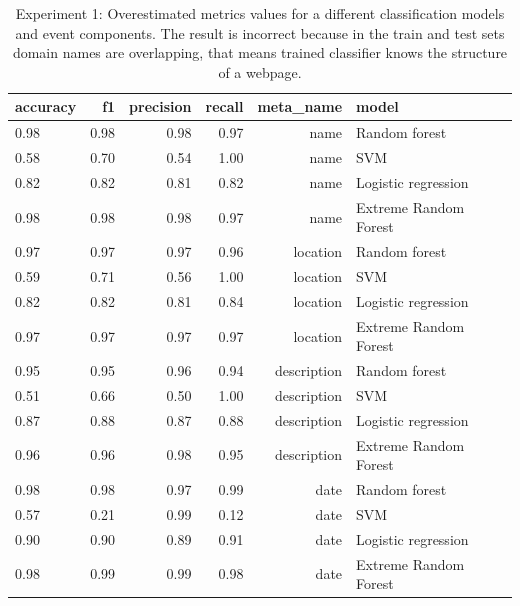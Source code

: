 \begin{table}[h]
\begin{center}
{\renewcommand{\arraystretch}{1.2}
\begin{tabular}{lrrrrll}
\toprule
accuracy &    f1 &  precision &  recall &    meta\_name &                  model \\
\midrule
0.98 &  0.98 &       0.98 &    0.97 &         name &          Random forest \\
0.58 &  0.70 &       0.54 &    1.00 &         name &                    SVM \\
0.82 &  0.82 &       0.81 &    0.82 &         name &    Logistic regression \\
0.98 &  0.98 &       0.98 &    0.97 &         name &  Extreme Random Forest \\
\midrule
0.97 &  0.97 &       0.97 &    0.96 &     location &          Random forest \\
0.59 &  0.71 &       0.56 &    1.00 &     location &                    SVM \\
0.82 &  0.82 &       0.81 &    0.84 &     location &    Logistic regression \\
0.97 &  0.97 &       0.97 &    0.97 &     location &  Extreme Random Forest \\
\midrule
0.95 &  0.95 &       0.96 &    0.94 &  description &          Random forest \\
0.51 &  0.66 &       0.50 &    1.00 &  description &                    SVM \\
0.87 &  0.88 &       0.87 &    0.88 &  description &    Logistic regression \\
0.96 &  0.96 &       0.98 &    0.95 &  description &  Extreme Random Forest \\
\midrule
0.98 &  0.98 &       0.97 &    0.99 &         date &          Random forest \\
0.57 &  0.21 &       0.99 &    0.12 &         date &                    SVM \\
0.90 &  0.90 &       0.89 &    0.91 &         date &    Logistic regression \\
0.98 &  0.99 &       0.99 &    0.98 &         date &  Extreme Random Forest \\
\bottomrule
\end{tabular}}
\caption{Experiment 1: Overestimated metrics values for a different classification models and event components. The result is incorrect because in the train and test sets domain names are overlapping, that means trained classifier knows the structure of a webpage.}
\label{table:sumresultOriginal}
\end{center}
\end{table} 


